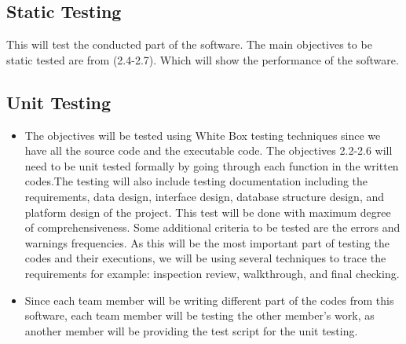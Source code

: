 \documentclass[12pt]{article}
\begin{document}
\subsection{Static Testing}
This will test the conducted part of the software. The main objectives to be static tested are from (2.4-2.7). Which will show the performance of the software. 
\subsection{Unit Testing}
\begin{itemize}
	\item The objectives will be tested using White Box testing techniques since we have all the source code and the executable code. The objectives 2.2-2.6 will need to be unit tested formally by going through each function in the written codes.The testing will also include testing documentation including the requirements, data design, interface design, database structure design, and platform design of the project.  This test will be done with maximum degree of comprehensiveness. Some additional criteria to be tested are the errors and warnings frequencies. As this will be the most important part of testing the codes and their executions, we will be using several techniques to trace the requirements for example: inspection review, walkthrough, and final checking. 
	\item Since each team member will be writing different part of the codes from this software, each team member will be testing the other member's work, as another member will be providing the test script for the unit testing. 
\end{itemize}
\end{document}
